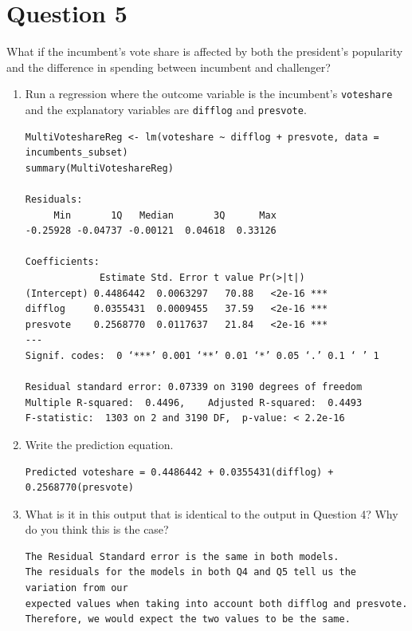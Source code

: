 \documentclass[12pt,letterpaper]{article}
\begin{document}
	\newpage	

\section*{Question 5}
\noindent What if the incumbent's vote share is affected by both the president's popularity and the difference in spending between incumbent and challenger? 
	\begin{enumerate}
		\item Run a regression where the outcome variable is the incumbent's \texttt{voteshare} and the explanatory variables are \texttt{difflog} and \texttt{presvote}.
\begin{verbatim}
MultiVoteshareReg <- lm(voteshare ~ difflog + presvote, data = incumbents_subset)
summary(MultiVoteshareReg)

Residuals:
     Min       1Q   Median       3Q      Max 
-0.25928 -0.04737 -0.00121  0.04618  0.33126 

Coefficients:
             Estimate Std. Error t value Pr(>|t|)    
(Intercept) 0.4486442  0.0063297   70.88   <2e-16 ***
difflog     0.0355431  0.0009455   37.59   <2e-16 ***
presvote    0.2568770  0.0117637   21.84   <2e-16 ***
---
Signif. codes:  0 ‘***’ 0.001 ‘**’ 0.01 ‘*’ 0.05 ‘.’ 0.1 ‘ ’ 1

Residual standard error: 0.07339 on 3190 degrees of freedom
Multiple R-squared:  0.4496,	Adjusted R-squared:  0.4493 
F-statistic:  1303 on 2 and 3190 DF,  p-value: < 2.2e-16
\end{verbatim}
\vspace{5cm}
		\item Write the prediction equation.

\begin{verbatim}
Predicted voteshare = 0.4486442 + 0.0355431(difflog) + 0.2568770(presvote)
\end{verbatim}
\vspace{5cm}
		\item What is it in this output that is identical to the output in Question 4? Why do you think this is the case?
\begin{verbatim}
The Residual Standard error is the same in both models.
The residuals for the models in both Q4 and Q5 tell us the variation from our
expected values when taking into account both difflog and presvote.
Therefore, we would expect the two values to be the same.	
\end{verbatim}
\end{enumerate}
\end{document}
